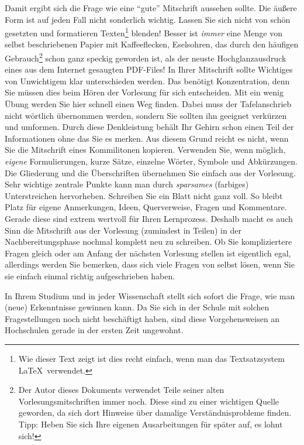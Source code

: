 Damit ergibt sich die Frage wie eine "`gute"' Mitschrift aussehen sollte. Die äußere Form ist
auf jeden Fall nicht sonderlich wichtig. Lassen Sie sich nicht von schön gesetzten und formatieren
Texten\footnote{Wie dieser Text zeigt ist dies recht einfach, wenn man das Textsatzsystem
\LaTeX\ verwendet.} blenden! Besser ist \emph{immer} eine Menge von selbst beschriebenen Papier 
mit Kaffeeflecken, Eselsohren, das durch den häufigen Gebrauch\footnote{Der Autor dieses Dokuments 
verwendet Teile seiner alten Vorlesungsmitschriften immer noch. Diese sind zu einer wichtigen Quelle 
geworden, da sich dort Hinweise über damalige Verständnisprobleme finden. Tipp: Heben Sie sich Ihre 
eigenen Ausarbeitungen für später auf, es lohnt sich!} schon ganz speckig geworden ist, als der neuste 
Hochglanzausdruck eines aus dem Internet gesaugten PDF-Files! In Ihrer Mitschrift sollte Wichtiges 
von Unwichtigem klar unterschieden werden. Das benötigt Konzentration, denn Sie müssen dies beim 
Hören der  Vorlesung für sich entscheiden. Mit ein wenig Übung werden Sie hier schnell einen Weg 
finden. Dabei muss der Tafelanschrieb nicht wörtlich übernommen werden, sondern Sie sollten ihn 
geeignet  verkürzen und umformen. Durch diese Denkleistung behält Ihr Gehirn schon einen Teil der 
Informationen ohne das Sie es merken. Aus diesem Grund reicht es nicht, wenn Sie 
die Mitschrift eines Kommilitonen kopieren. Verwenden Sie, wenn möglich, \emph{eigene}
Formulierungen, kurze Sätze, einzelne Wörter, Symbole und Abkürzungen. Die Gliederung
und die Überschriften übernehmen Sie einfach aus der Vorlesung. Sehr wichtige zentrale
Punkte kann man durch \emph{sparsames} (farbiges) Unterstreichen hervorheben. Schreiben
Sie ein Blatt nicht ganz voll. So bleibt Platz für eigene Anmerkungen, Ideen, Querverweise,
Fragen und Kommentare. Gerade diese sind extrem wertvoll für Ihren Lernprozess.  
Deshalb macht es auch Sinn die Mitschrift aus der Vorlesung (zumindest in Teilen) in der 
Nachbereitungsphase nochmal komplett neu zu schreiben. Ob Sie kompliziertere Fragen gleich oder 
am Anfang der nächsten Vorlesung stellen ist eigentlich egal, allerdings werden Sie bemerken, dass 
sich viele Fragen  von selbst lösen, wenn Sie sie einfach einmal richtig aufgeschrieben haben.

\bigskip

In Ihrem Studium und in jeder Wissenschaft stellt sich sofort die Frage, wie man (neue)
Erkenntnisse gewinnen kann.  Da Sie sich in der Schule mit solchen Fragestellungen
noch nicht beschäftigt haben, sind diese Vorgehensweisen an Hochschulen gerade in der 
ersten Zeit ungewohnt. 

